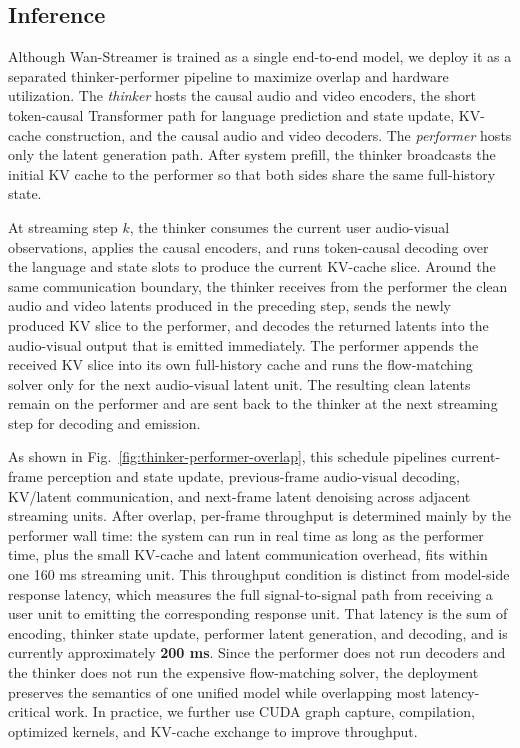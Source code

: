 \documentclass{llmxive}
\begin{document}
\subsection{Inference}
\label{sec:inference}
Although Wan-Streamer is trained as a single end-to-end model, we deploy it as a separated thinker-performer pipeline to maximize overlap and hardware utilization. The \textit{thinker} hosts the causal audio and video encoders, the short token-causal Transformer path for language prediction and state update, KV-cache construction, and the causal audio and video decoders. The \textit{performer} hosts only the latent generation path. After system prefill, the thinker broadcasts the initial KV cache to the performer so that both sides share the same full-history state.

At streaming step $k$, the thinker consumes the current user audio-visual observations, applies the causal encoders, and runs token-causal decoding over the language and state slots to produce the current KV-cache slice. Around the same communication boundary, the thinker receives from the performer the clean audio and video latents produced in the preceding step, sends the newly produced KV slice to the performer, and decodes the returned latents into the audio-visual output that is emitted immediately. The performer appends the received KV slice into its own full-history cache and runs the flow-matching solver only for the next audio-visual latent unit. The resulting clean latents remain on the performer and are sent back to the thinker at the next streaming step for decoding and emission.

As shown in Fig.~\ref{fig:thinker-performer-overlap}, this schedule pipelines current-frame perception and state update, previous-frame audio-visual decoding, KV/latent communication, and next-frame latent denoising across adjacent streaming units. After overlap, per-frame throughput is determined mainly by the performer wall time: the system can run in real time as long as the performer time, plus the small KV-cache and latent communication overhead, fits within one 160 ms streaming unit. This throughput condition is distinct from model-side response latency, which measures the full signal-to-signal path from receiving a user unit to emitting the corresponding response unit. That latency is the sum of encoding, thinker state update, performer latent generation, and decoding, and is currently approximately \textbf{200 ms}. Since the performer does not run decoders and the thinker does not run the expensive flow-matching solver, the deployment preserves the semantics of one unified model while overlapping most latency-critical work. In practice, we further use CUDA graph capture, compilation, optimized kernels, and KV-cache exchange to improve throughput.
\end{document}
